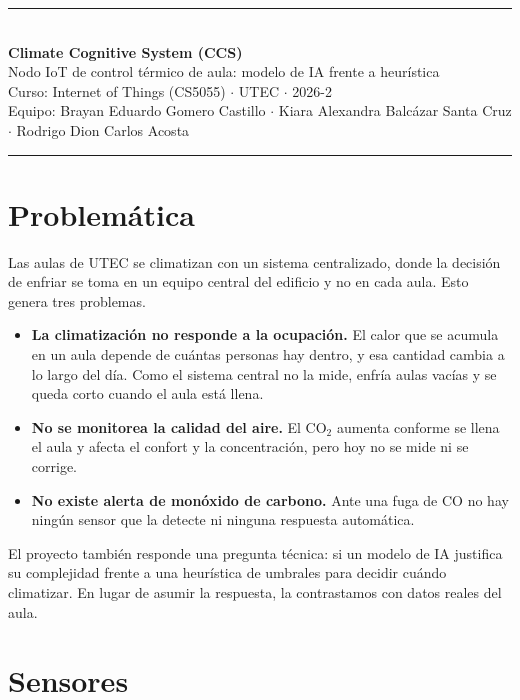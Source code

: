 \documentclass[10pt,a4paper]{article}
\begin{document}
\noindent\rule{\textwidth}{1.2pt}\\[3pt]
{\large\bfseries Climate Cognitive System (CCS)}\\[2pt]
{\normalsize Nodo IoT de control térmico de aula: modelo de IA frente a heurística}\\[5pt]
{\footnotesize Curso: Internet of Things (CS5055) $\cdot$ UTEC $\cdot$ 2026-2}\\[1pt]
{\footnotesize Equipo: Brayan Eduardo Gomero Castillo $\cdot$ Kiara Alexandra Balcázar
Santa Cruz $\cdot$ Rodrigo Dion Carlos Acosta}\\[4pt]
\noindent\rule{\textwidth}{0.5pt}

\section{Problemática}

Las aulas de UTEC se climatizan con un sistema centralizado, donde la decisión de enfriar se
toma en un equipo central del edificio y no en cada aula. Esto genera tres problemas.

\begin{itemize}[leftmargin=1.2em,itemsep=1.5pt,topsep=2pt,parsep=0pt]
  \item \textbf{La climatización no responde a la ocupación.} El calor que se acumula en un
  aula depende de cuántas personas hay dentro, y esa cantidad cambia a lo largo del día.
  Como el sistema central no la mide, enfría aulas vacías y se queda corto cuando el aula
  está llena.
  \item \textbf{No se monitorea la calidad del aire.} El CO$_2$ aumenta conforme se llena el
  aula y afecta el confort y la concentración, pero hoy no se mide ni se corrige.
  \item \textbf{No existe alerta de monóxido de carbono.} Ante una fuga de CO no hay ningún
  sensor que la detecte ni ninguna respuesta automática.
\end{itemize}

El proyecto también responde una pregunta técnica: si un modelo de IA justifica su
complejidad frente a una heurística de umbrales para decidir cuándo climatizar. En lugar de
asumir la respuesta, la contrastamos con datos reales del aula.

\section{Sensores}
\end{document}
